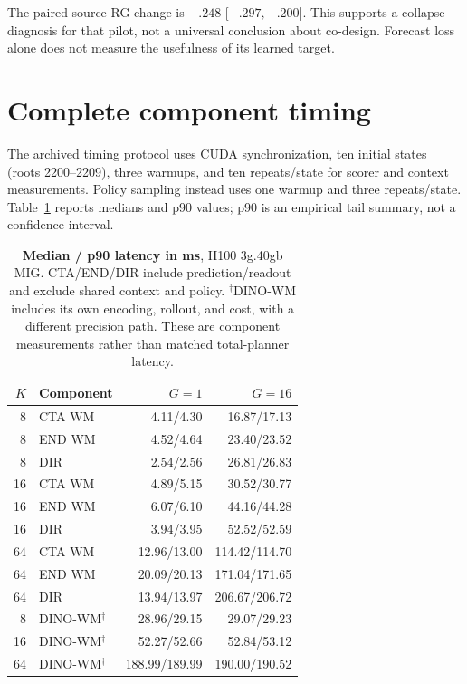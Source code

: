 \documentclass[10pt,twocolumn,letterpaper]{article}
\begin{document}
The paired source-RG change is $-.248$ [$-.297,-.200$]. This supports a collapse diagnosis for that pilot, not a universal conclusion about co-design. Forecast loss alone does not measure the usefulness of its learned target.

\section{Complete component timing}
The archived timing protocol uses CUDA synchronization, ten initial states (roots 2200--2209), three warmups, and ten repeats/state for scorer and context measurements. Policy sampling instead uses one warmup and three repeats/state. Table~\ref{tab:fulltiming} reports medians and p90 values; p90 is an empirical tail summary, not a confidence interval.

\begin{table}[t]
\centering\small
\setlength{\tabcolsep}{3pt}
\begin{tabular}{rlrr}
\toprule
$K$ & Component & $G=1$ & $G=16$ \\
\midrule
8 & CTA WM & 4.11/4.30 & 16.87/17.13 \\
8 & END WM & 4.52/4.64 & 23.40/23.52 \\
8 & DIR & 2.54/2.56 & 26.81/26.83 \\
16 & CTA WM & 4.89/5.15 & 30.52/30.77 \\
16 & END WM & 6.07/6.10 & 44.16/44.28 \\
16 & DIR & 3.94/3.95 & 52.52/52.59 \\
64 & CTA WM & 12.96/13.00 & 114.42/114.70 \\
64 & END WM & 20.09/20.13 & 171.04/171.65 \\
64 & DIR & 13.94/13.97 & 206.67/206.72 \\
\midrule
8 & DINO-WM$^\dagger$ & 28.96/29.15 & 29.07/29.23 \\
16 & DINO-WM$^\dagger$ & 52.27/52.66 & 52.84/53.12 \\
64 & DINO-WM$^\dagger$ & 188.99/189.99 & 190.00/190.52 \\
\bottomrule
\end{tabular}
\caption{\textbf{Median / p90 latency in ms}, H100 3g.40gb MIG. CTA/END/DIR include prediction/readout and exclude shared context and policy. $^\dagger$DINO-WM includes its own encoding, rollout, and cost, with a different precision path. These are component measurements rather than matched total-planner latency.}
\label{tab:fulltiming}
\end{table}
\end{document}
